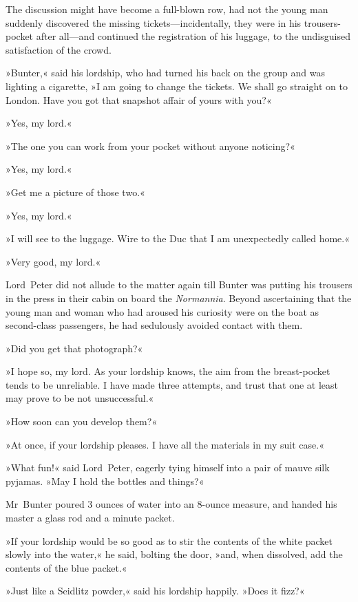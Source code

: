 The discussion might have become a full-blown row, had not the young man suddenly discovered the missing tickets—incidentally, they were in his trousers-pocket after all—and continued the registration of his luggage, to the undisguised satisfaction of the crowd.

»Bunter,« said his lordship, who had turned his back on the group and was lighting a cigarette, »I am going to change the tickets. We shall go straight on to London. Have you got that snapshot affair of yours with you?«

»Yes, my lord.«

»The one you can work from your pocket without anyone noticing?«

»Yes, my lord.«

»Get me a picture of those two.«

»Yes, my lord.«

»I will see to the luggage. Wire to the Duc that I am unexpectedly called home.«

»Very good, my lord.«

Lord~Peter did not allude to the matter again till Bunter was putting his trousers in the press in their cabin on board the \textit{Normannia}. Beyond ascertaining that the young man and woman who had aroused his curiosity were on the boat as second-class passengers, he had sedulously avoided contact with them.

»Did you get that photograph?«

»I hope so, my lord. As your lordship knows, the aim from the breast-pocket tends to be unreliable. I have made three attempts, and trust that one at least may prove to be not unsuccessful.«

»How soon can you develop them?«

»At once, if your lordship pleases. I have all the materials in my suit case.«

»What fun!« said Lord~Peter, eagerly tying himself into a pair of mauve silk pyjamas. »May I hold the bottles and things?«

Mr~Bunter poured 3 ounces of water into an 8-ounce measure, and handed his master a glass rod and a minute packet.

»If your lordship would be so good as to stir the contents of the white packet slowly into the water,« he said, bolting the door, »and, when dissolved, add the contents of the blue packet.«

»Just like a Seidlitz powder,« said his lordship happily. »Does it fizz?«

